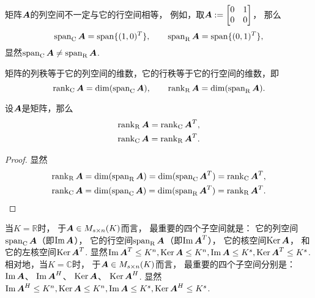 矩阵\(\vb{A}\)的列空间不一定与它的行空间相等，
例如，取\(
	\vb{A}
	\defeq
	\begin{bmatrix}
		0 & 1 \\
		0 & 0
	\end{bmatrix}
\)，
那么\begin{equation*}
	\SpanC\vb{A}
	= \Span\{(1,0)^T\},
	\qquad
	\SpanR\vb{A}
	= \Span\{(0,1)^T\},
\end{equation*}
显然\(\SpanC\vb{A} \neq \SpanR\vb{A}\).

矩阵的列秩等于它的列空间的维数，它的行秩等于它的行空间的维数，即\begin{equation*}
	\RankC\vb{A} = \dim(\SpanC\vb{A}),
	\qquad
	\RankR\vb{A} = \dim(\SpanR\vb{A}).
\end{equation*}

\begin{proposition}\label{theorem:向量空间.矩阵的行秩与列秩分别等于它的转置矩阵的列秩与行秩}
设\(\vb{A}\)是矩阵，那么\begin{gather}
	\RankR\vb{A} = \RankC\vb{A}^T, \\
	\RankC\vb{A} = \RankR\vb{A}^T.
\end{gather}
\begin{proof}
显然\begin{gather*}
	\RankR\vb{A}
	= \dim(\SpanR\vb{A})
	= \dim(\SpanC\vb{A}^T)
	= \RankC\vb{A}^T, \\
	\RankC\vb{A}
	= \dim(\SpanC\vb{A})
	= \dim(\SpanR\vb{A}^T)
	= \RankR\vb{A}^T.
	\qedhere
\end{gather*}
\end{proof}
\end{proposition}

当\(K = \mathbb{R}\)时，
于\(\vb{A} \in M_{s \times n}(K)\)而言，
最重要的四个子空间就是：
它的列空间\(\SpanC\vb{A}\)（即\(\Im\vb{A}\)），
它的行空间\(\SpanR\vb{A}\)（即\(\Im\vb{A}^T\)），
它的核空间\(\Ker\vb{A}\)，
和它的左核空间\(\Ker\vb{A}^T\).
显然\(
	\Im\vb{A}^T \leq K^n,
	\Ker\vb{A} \leq K^n,
	\Im\vb{A} \leq K^s,
	\Ker\vb{A}^T \leq K^s
\).
相对地，当\(K = \mathbb{C}\)时，
于\(\vb{A} \in M_{s \times n}(K)\)而言，
最重要的四个子空间分别是：
\(\Im\vb{A}\)、
\(\Im\vb{A}^H\)、
\(\Ker\vb{A}\)、
\(\Ker\vb{A}^H\).
显然\(
	\Im\vb{A}^H \leq K^n,
	\Ker\vb{A} \leq K^n,
	\Im\vb{A} \leq K^s,
	\Ker\vb{A}^H \leq K^s
\).

